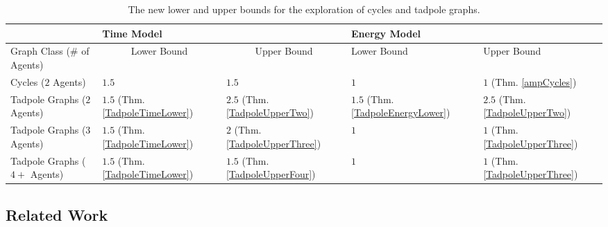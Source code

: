 \begin{table}[H]
    \small
    \begin{adjustbox}{center}
    \begin{tabular}{|l|ll|ll|}
    \hline
                                  & \multicolumn{2}{l|}{Time Model}                                     & \multicolumn{2}{l|}{Energy Model}              \\ \hline
    Graph Class (\# of Agents)                            & \multicolumn{1}{c|}{Lower Bound} & \multicolumn{1}{c|}{Upper Bound} & \multicolumn{1}{l|}{Lower Bound} & Upper Bound \\ \hline
    Cycles ($2$ Agents)             & \multicolumn{1}{l|}{$1.5$ \cite{Higashikawa2012}}         & $1.5$ \cite{Higashikawa2012}                              & \multicolumn{1}{l|}{$1$}           & $1$ (Thm. \ref{ampCycles})           \\ \hline
    Tadpole Graphs ($2$ Agents)     & \multicolumn{1}{l|}{$1.5$ (Thm. \ref{TadpoleTimeLower})}        & $2.5$ (Thm. \ref{TadpoleUpperTwo})                             & \multicolumn{1}{l|}{$1.5$ (Thm. \ref{TadpoleEnergyLower})}         & $2.5$ (Thm. \ref{TadpoleUpperTwo})      \\ \hline
    Tadpole Graphs ($3$ Agents)     & \multicolumn{1}{l|}{$1.5$ (Thm. \ref{TadpoleTimeLower})}          & $2$ (Thm. \ref{TadpoleUpperThree})                             & \multicolumn{1}{l|}{$1$}           & $1$ (Thm. \ref{TadpoleUpperThree})          \\ \hline
    Tadpole Graphs ($4+$ Agents)     & \multicolumn{1}{l|}{$1.5$ (Thm. \ref{TadpoleTimeLower})}       & $1.5$ (Thm. \ref{TadpoleUpperFour})                             & \multicolumn{1}{l|}{$1$}           & $1$ (Thm. \ref{TadpoleUpperThree})          \\ \hline
    \end{tabular}
    \end{adjustbox}
    \caption{The new lower and upper bounds for the exploration of cycles and tadpole graphs.}
    \label{resultstable}
\end{table}

\subsection{Related Work}

